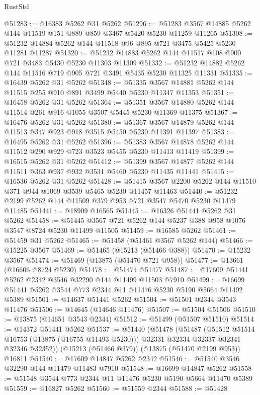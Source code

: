\begin{lexlean}{RustStd}
\begin{coremodule}
@51283 := @16383 @5262 @31 @5262
@51296 := @51283 @3567 @14885 @5262 @144 @11519 @151 @889 @859 @3467 @5420 @5230 @11259 @11265
@51308 := @51232 @14884 @5262 @144 @11518 @96 @895 @721 @3475 @5425 @5230 @11281 @11287
@51320 := @51232 @14883 @5262 @144 @11517 @108 @900 @721 @3483 @5430 @5230 @11303 @11309
@51332 := @51232 @14882 @5262 @144 @11516 @719 @905 @721 @3491 @5435 @5230 @11325 @11331
@51335 := @16439 @5262 @31 @5262
@51348 := @51335 @3567 @14881 @5262 @144 @11515 @255 @910 @891 @3499 @5440 @5230 @11347 @11353
@51351 := @16458 @5262 @31 @5262
@51364 := @51351 @3567 @14880 @5262 @144 @11514 @261 @916 @1055 @3507 @5445 @5230 @11369 @11375
@51367 := @16476 @5262 @31 @5262
@51380 := @51367 @3567 @14879 @5262 @144 @11513 @347 @923 @918 @3515 @5450 @5230 @11391 @11397
@51383 := @16495 @5262 @31 @5262
@51396 := @51383 @3567 @14878 @5262 @144 @11512 @290 @929 @723 @3523 @5455 @5230 @11413 @11419
@51399 := @16515 @5262 @31 @5262
@51412 := @51399 @3567 @14877 @5262 @144 @11511 @363 @937 @932 @3531 @5460 @5230 @11435 @11441
@51415 := @16536 @5262 @31 @5262
@51428 := @51415 @3567 @2200 @5262 @144 @11510 @371 @944 @1069 @3539 @5465 @5230 @11457 @11463
@51440 := @51232 @2199 @5262 @144 @11509 @379 @953 @721 @3547 @5470 @5230 @11479 @11485
@51441 := @18909 @16565
@51445 := @16326 @51441 @5262 @31 @5262
@51458 := @51445 @3567 @721 @5262 @144 @5237 @388 @958 @1076 @3547 @8724 @5230 @11499 @11505
@51459 := @16585 @5262
@51461 := @51459 @31 @5262
@51465 := @51458 (@51461 @3567 @5262 @144)
@51466 := @15225 @3567
@51469 := @51465 (@15213 (@51466 @388))
@51470 := @15232 @3567
@51474 := @51469 (@13875 (@51470 @721 @958))
@51477 := @13661 (@16606 @8724 @5230)
@51478 := @51474 @51477
@51487 := @17609 @51441 @5262 @2342 @3546 @32290 @144 @11499 @11503 @7910
@51499 := @16699 @51441 @5262 @3544 @773 @2344 @11 @11476 @5230 @5190 @5664 @11492 @5389
@51501 := @14637 @51441 @5262
@51504 := @51501 @2344 @3543 @11476
@51506 := @14645 (@14646 @11476)
@51507 := @51504 @51506
@51510 := @13875 (@14651 @3543 @2344)
@51512 := @51499 (@51507 @51510)
@51514 := @14372 @51441 @5262
@51537 := @51440
    (@51478
      (@51487
        (@51512 @51514 @16753 (@13875 (@16755 @11493 @5230)))
        @32331
        @32334
        @32337
        @32341
        @32346
        @32352))
    (@15213 (@51466 @379))
    (@13875 (@51470 @2199 @953))
    @16811
@51540 := @17609 @14847 @5262 @2342
@51546 := @51540 @3546 @32290 @144 @11479 @11483 @7910
@51548 := @16699 @14847 @5262
@51558 := @51548 @3544 @773 @2344 @11 @11476 @5230 @5190 @5664 @11470 @5389
@51559 := @16827 @5262
@51560 := @51559 @2344
@51588 := @51428

\end{coremodule}
\end{lexlean}
